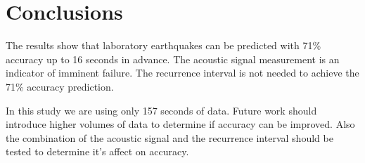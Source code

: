 \documentclass[]{llncs} %
\begin{document}
\section{Conclusions}

The results show that laboratory earthquakes can be predicted with 71\% accuracy up to 16 seconds in advance. The acoustic signal measurement is an indicator of imminent failure. The recurrence interval is not needed to achieve the 71\% accuracy prediction. \par

In this study we are using only 157 seconds of data. Future work should introduce higher volumes of data to determine if accuracy can be improved. Also the combination of the acoustic signal and the recurrence interval should be tested to determine it's affect on accuracy. 
\par



\end{document}
